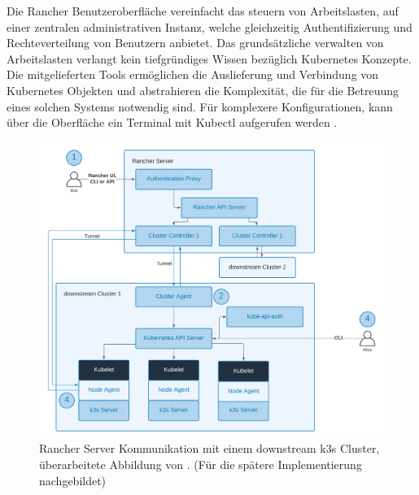 Die Rancher Benutzeroberfläche vereinfacht das steuern von Arbeitslasten, auf einer zentralen administrativen Instanz, welche gleichzeitig Authentifizierung und Rechteverteilung von Benutzern anbietet.
Das grundsätzliche verwalten von Arbeitslasten verlangt kein tiefgründiges Wissen bezüglich Kubernetes Konzepte. 
Die mitgelieferten Tools ermöglichen die Auslieferung und Verbindung von Kubernetes Objekten und abstrahieren die Komplexität, die für die Betreuung eines solchen Systems notwendig sind.
Für komplexere Konfigurationen, kann über die Oberfläche ein Terminal mit Kubectl aufgerufen werden \cite{rancher,AzureKubernetesService}.

\begin{figure}
  \centering
  \includegraphics[width=1.0\columnwidth]{images/RancherArchitekturClusterController.png}
  \caption{Rancher Server Kommunikation mit einem downstream k3s Cluster, überarbeitete Abbildung von \cite{rancherArchitecture}. (Für die spätere Implementierung nachgebildet)}
  \label{fig:rancherarchitektur}
\end{figure}


